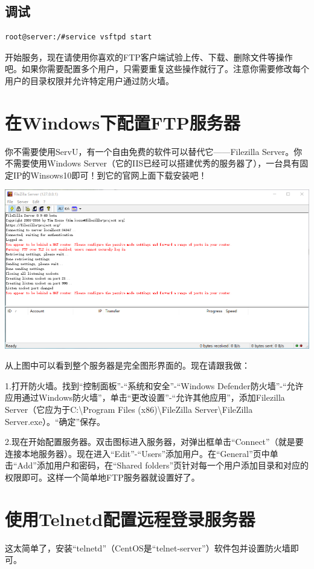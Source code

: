 \subsection{调试}
\begin{verbatim}
root@server:/#service vsftpd start
\end{verbatim}\par
开始服务，现在请使用你喜欢的FTP客户端试验上传、下载、删除文件等操作吧。如果你需要配置多个用户，只需要重复这些操作就行了。注意你需要修改每个用户的目录权限并允许特定用户通过防火墙。
\section{在Windows下配置FTP服务器}
你不需要使用ServU，有一个自由免费的软件可以替代它——Filezilla Server。你不需要使用Windows Server（它的IIS已经可以搭建优秀的服务器了），一台具有固定IP的Winsows10即可！到它的官网上面下载安装吧！
\begin{center}
	\includegraphics[scale=0.6]{pic/fzs}
\end{center} \par
从上图中可以看到整个服务器是完全图形界面的。现在请跟我做：\par
1.打开防火墙。找到“控制面板”-“系统和安全”-“Windows Defender防火墙”-“允许应用通过Windows防火墙”，单击“更改设置”-“允许其他应用”，添加Filezilla Server（它应为于C:\textbackslash Program Files (x86)\textbackslash FileZilla Server\textbackslash FileZilla Server.exe）。“确定”保存。\par
2.现在开始配置服务器。双击图标进入服务器，对弹出框单击“Connect”（就是要连接本地服务器）。现在进入“Edit”-“Users”添加用户。在“General”页中单击“Add”添加用户和密码，在“Shared folders”页针对每一个用户添加目录和对应的权限即可。这样一个简单地FTP服务器就设置好了。
\section{使用Telnetd配置远程登录服务器}
这太简单了，安装“telnetd”（CentOS是“telnet-server”）软件包并设置防火墙即可。
